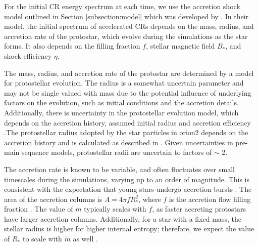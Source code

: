 \documentclass[twocolumn]{aastex63}
\begin{document}
For the initial CR energy spectrum at each time, we use the accretion shock model outlined in Section \ref{subsection:model} which was developed by \cite{gaches_2018_exploration}. In their model, the initial spectrum of accelerated CRs depends on the mass, radius, and accretion rate of the protostar, which evolve during the \cite{offner_2017_impact} simulations as the star forms. It also depends on the filling fraction $f$, stellar magnetic field $B_*$, and shock efficiency $\eta$.

The mass, radius, and accretion rate of the protostar are determined by a model for protostellar evolution. The radius is a somewhat uncertain parameter and may not be single valued with mass due to the potential influence of underlying factors on the evolution, such as initial conditions and the accretion details. Additionally, there is uncertainty in the protostellar evolution model, which depends on the accretion history, assumed initial radius and accretion efficiency \citep{hosokawa_2011_model}.The protostellar radius adopted by the star particles in {\sc orion2} depends on the accretion history and is calculated as described in \cite{offner_2009_radiative}. Given uncertainties in pre-main sequence models, protostellar radii are uncertain to factors of $\sim$ 2. 

The accretion rate is known to be variable, and often fluctuates over small timescales during the \cite{offner_2017_impact} simulations, varying up to an order of magnitude. This is consistent with the expectation that young stars undergo accretion bursts \citep{audard_2014_ppvi}. The area of the accretion columns is $A=4\pi fR_*^2$, where $f$ is the accretion flow filling fraction \citep{gaches_2018_exploration}. The value of $\dot{m}$ typically scales with $f$, as faster accreting protostars have larger accretion columns. Additionally, for a star with a fixed mass, the stellar radius is higher for higher internal entropy; therefore, we expect the value of $R_*$ to scale with $\dot{m}$ as well \citep{hosokawa_2011_model}.
\end{document}
